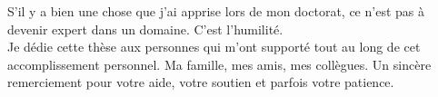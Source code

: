 \begin{dedic}

\og S'il y a bien une chose que j'ai apprise lors de mon doctorat, ce n'est pas à devenir expert dans un domaine. C'est l'humilité. \fg
\\[50pt]
Je dédie cette thèse aux personnes qui m'ont supporté tout au long de cet accomplissement personnel. Ma famille, mes amis, mes collègues. Un sincère remerciement pour votre aide, votre soutien et parfois votre patience.

\end{dedic}